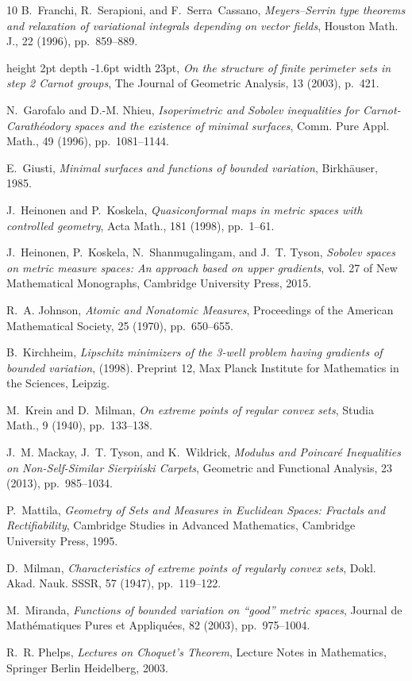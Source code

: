 \documentclass[reqno]{amsart}
\numberwithin{equation}{section}
\newcommand{\1}{\mathbbm 1}
\begin{document}
\begin{thebibliography}{10}
{\sc B.~Franchi, R.~Serapioni, and F.~Serra~Cassano}, {\em Meyers--{S}errin
  type theorems and relaxation of variational integrals depending on vector
  fields}, Houston Math. J., 22 (1996), pp.~859--889.

\leavevmode\vrule height 2pt depth -1.6pt width 23pt, {\em On the structure of
  finite perimeter sets in step 2 {C}arnot groups}, The Journal of Geometric
  Analysis, 13 (2003), p.~421.

{\sc N.~Garofalo and D.-M. Nhieu}, {\em Isoperimetric and {S}obolev
  inequalities for {C}arnot-{C}arath\'eodory spaces and the existence of
  minimal surfaces}, Comm. Pure Appl. Math., 49 (1996), pp.~1081--1144.

{\sc E.~Giusti}, {\em Minimal surfaces and functions of bounded variation},
  Birkh\"{a}user, 1985.

{\sc J.~Heinonen and P.~Koskela}, {\em Quasiconformal maps in metric spaces
  with controlled geometry}, Acta Math., 181 (1998), pp.~1--61.

{\sc J.~Heinonen, P.~Koskela, N.~Shanmugalingam, and J.~T. Tyson}, {\em Sobolev
  spaces on metric measure spaces: {A}n approach based on upper gradients},
  vol. 27 of New Mathematical Monographs, Cambridge University Press, 2015.

{\sc R.~A. Johnson}, {\em Atomic and {N}onatomic {M}easures}, Proceedings of
  the American Mathematical Society, 25 (1970), pp.~650--655.

{\sc B.~Kirchheim}, {\em Lipschitz minimizers of the 3-well problem having
  gradients of bounded variation},  (1998).
\newblock Preprint 12, Max Planck Institute for Mathematics in the Sciences,
  Leipzig.

{\sc M.~Krein and D.~Milman}, {\em On extreme points of regular convex sets},
  Studia Math., 9 (1940), pp.~133--138.

{\sc J.~M. Mackay, J.~T. Tyson, and K.~Wildrick}, {\em Modulus and
  {P}oincar{\'e} {I}nequalities on {N}on-{S}elf-{S}imilar {S}ierpi{\'{n}}ski
  {C}arpets}, Geometric and Functional Analysis, 23 (2013), pp.~985--1034.

{\sc P.~Mattila}, {\em Geometry of {S}ets and {M}easures in {E}uclidean
  {S}paces: {F}ractals and {R}ectifiability}, Cambridge Studies in Advanced
  Mathematics, Cambridge University Press, 1995.

{\sc D.~Milman}, {\em Characteristics of extreme points of regularly convex
  sets}, Dokl. Akad. Nauk. SSSR, 57 (1947), pp.~119--122.

{\sc M.~Miranda}, {\em Functions of bounded variation on ``good'' metric
  spaces}, Journal de Math\'{e}matiques Pures et Appliqu\'{e}es, 82 (2003),
  pp.~975--1004.

{\sc R.~R. Phelps}, {\em Lectures on {C}hoquet's {T}heorem}, Lecture Notes in
  Mathematics, Springer Berlin Heidelberg, 2003.

\end{thebibliography}
%
%
%
%
\end{document}
